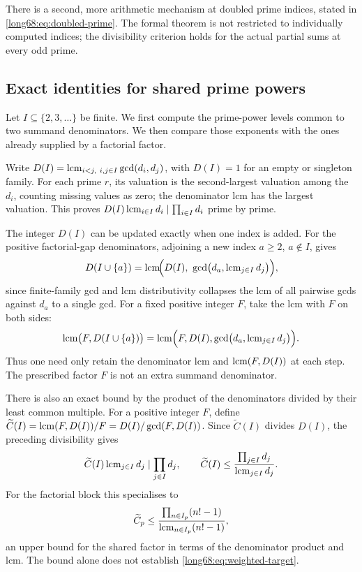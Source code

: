 \documentclass[11pt]{article}
\begin{document}
There is a second, more arithmetic mechanism at doubled prime indices, stated
in \eqref{long68:eq:doubled-prime}.  The formal theorem is not
restricted to individually computed indices; the divisibility criterion
holds for the actual partial sums at every odd prime.

\subsection{Exact identities for shared prime powers}\label{long68:sec:ext-collision}

Let $I\subseteq\{2,3,\ldots\}$ be finite. We first compute the
prime-power levels common to two summand denominators. We then compare
those exponents with the ones already supplied by a factorial factor.

Write $D(I)=\operatorname{lcm}_{i<j,\ i,j\in I}\gcd(d_i,d_j)$, with $D(I)=1$
for an empty or singleton family. For each prime $r$, its valuation is the
second-largest valuation among the $d_i$, counting missing values as zero;
the denominator lcm has the largest valuation. This proves
$D(I)\operatorname{lcm}_{i\in I}d_i\mid\prod_{i\in I}d_i$ prime by prime.

The integer $D(I)$ can be updated exactly when one index is added. For the positive
factorial-gap denominators, adjoining a new index $a\ge2$, $a\notin I$, gives
\[
 D(I\cup\{a\})=\lcm\!\Bigl(D(I),\ \gcd\bigl(d_a,\lcm_{j\in I}d_j\bigr)\Bigr),
\]
since finite-family gcd and lcm distributivity collapses the lcm of all
pairwise gcds against $d_a$ to a single gcd. For a fixed positive integer
$F$, take the lcm with $F$ on both sides:
\[
 \operatorname{lcm}\bigl(F,D(I\cup\{a\})\bigr)
 =\operatorname{lcm}\Bigl(F,D(I),\gcd\bigl(d_a,\operatorname{lcm}_{j\in I}d_j\bigr)\Bigr).
\]
Thus one need only retain the denominator lcm and $\operatorname{lcm}(F,D(I))$ at each
step. The prescribed factor $F$ is not an extra summand denominator.

There is also an exact bound by the product of the denominators divided
by their least common multiple. For a positive integer $F$, define
$\widetilde C(I)=\operatorname{lcm}(F,D(I))/F=D(I)/\gcd(F,D(I))$. Since
$\widetilde C(I)$ divides $D(I)$, the preceding divisibility gives
\[
 \widetilde C(I)\operatorname{lcm}_{j\in I}d_j\mid\prod_{j\in I}d_j,\qquad
 \widetilde C(I)\le\frac{\prod_{j\in I}d_j}{\operatorname{lcm}_{j\in I}d_j}.
\]  For the factorial block this specialises to
\[
 \widetilde C_p\le\frac{\prod_{n\in I_p}(n!-1)}{\operatorname{lcm}_{n\in I_p}(n!-1)},
\]
an upper bound for the shared factor in terms of the denominator product
and lcm. The bound alone does not establish
\eqref{long68:eq:weighted-target}.
\end{document}
